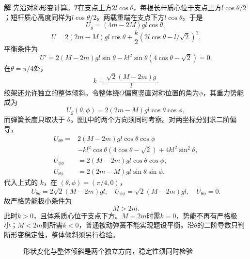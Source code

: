 \documentclass[11pt,openany,fontset=fandol]{ctexbook}
\theoremstyle{definition}\newtheorem{example}{例}[chapter]\newtheorem{exercise}{习题}[chapter]
\newcommand{\SolutionStart}{\par\medskip\ifdim\pagetotal>0pt\ifdim\dimexpr\pagegoal-\pagetotal\relax<3\baselineskip\newpage\fi\fi\noindent\textbf{解}\quad\ignorespaces}
\newenvironment{solution}{\SolutionStart}{\par\medskip}
\begin{document}
\begin{solution}
先沿对称形变计算。$T$在支点上方$2l\cos\theta$，每根长杆质心位于支点上方$l\cos\theta/2$；短杆质心高度同样为$l\cos\theta/2$。两载重端在支点下方$l\cos\theta$。于是
\[
 U_g=(4m-2M)gl\cos\theta,
\]
\[
 U=2(2m-M)gl\cos\theta
        +\frac k2(2l\cos\theta-l/\sqrt2)^2.
\]
平衡条件为
\[
 U'=2(M-2m)gl\sin\theta
        -kl^2\sin\theta(4\cos\theta-\sqrt2)=0.
\]
在$\theta=\pi/4$处，
\[
 \boxed{k=\frac{\sqrt2(M-2m)g}{l}}.
\]
绞架还允许独立的整体倾斜。令整体绕$O$偏离竖直对称位置的角为$\phi$，其重力势能成为
\[
 U_g(\theta,\phi)=2(2m-M)gl\cos\theta\cos\phi,
\]
而弹簧长度只取决于 $\theta$。图\ref{mp5:fig:hw:l5-34-s}中的两个方向须同时考察。对两坐标分别求二阶偏导，
\[
\begin{aligned}
U_{\theta\theta}={}&2(M-2m)gl\cos\theta\cos\phi\\
&-kl^2\cos\theta(4\cos\theta-\sqrt2)+4kl^2\sin^2\theta,\\
U_{\phi\phi}&=2(M-2m)gl\cos\theta\cos\phi,\\
U_{\theta\phi}&=2(2m-M)gl\sin\theta\sin\phi.
\end{aligned}
\]
代入上式的 $k$，在 $(\theta,\phi)=(\pi/4,0)$，
\[
 U_{\theta\theta}=2\sqrt2(M-2m)gl,\quad
 U_{\phi\phi}=\sqrt2(M-2m)gl,\quad U_{\theta\phi}=0.
\]
故严格势能极小条件为
\[
 \boxed{M>2m}.
\]
此时$k>0$，且体系质心位于支点下方。$M=2m$时需$k=0$，势能不再有严格极小；$M<2m$则所需$k<0$，普通被动弹簧不能实现题设平衡。沿$\theta$的二阶导数只判断形变稳定性，整体倾斜须另行检验。


\begin{figure}[H]\centering
{}
\caption{形状变化与整体倾斜是两个独立方向，稳定性须同时检验}\label{mp5:fig:hw:l5-34-s}
\end{figure}

\end{solution}
\end{document}
